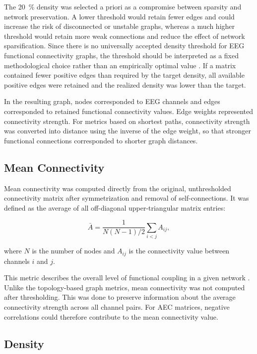 The \SI{20}{\percent} density was selected a priori as a compromise between
sparsity and network preservation. A lower threshold would retain fewer edges
and could increase the risk of disconnected or unstable graphs, whereas a much
higher threshold would retain more weak connections and reduce the effect of
network sparsification. Since there is no universally accepted density threshold
for EEG functional connectivity graphs, the threshold should be interpreted as a
fixed methodological choice rather than an empirically optimal value
\cite{Garrison2015,Adamovich2022}. If a matrix contained fewer positive edges
than required by the target density, all available positive edges were retained
and the realized density was lower than the target.

In the resulting graph, nodes corresponded to EEG channels and edges
corresponded to retained functional connectivity values. Edge weights
represented connectivity strength. For metrics based on shortest paths,
connectivity strength was converted into distance using the inverse of the
edge weight, so that stronger functional connections corresponded to shorter
graph distances.

\subsection{Mean Connectivity}
\label{subsec:mean-connectivity}

Mean connectivity was computed directly from the original, unthresholded
connectivity matrix after symmetrization and removal of self-connections. It was
defined as the average of all off-diagonal upper-triangular matrix entries:

\[
    \bar{A}
    =
    \frac{1}{N(N-1)/2}
    \sum_{i<j} A_{ij},
\]

where $N$ is the number of nodes and $A_{ij}$ is the connectivity value between
channels $i$ and $j$.

This metric describes the overall level of functional coupling in a given
network \cite{Friston1994,Rubinov2010}. Unlike the topology-based graph metrics, mean connectivity was not
computed after thresholding. This was done to preserve information about the
average connectivity strength across all channel pairs. For AEC matrices,
negative correlations could therefore contribute to the mean connectivity
value.

\subsection{Density}
\label{subsec:density}

